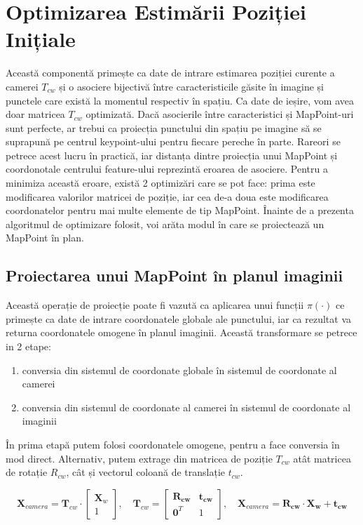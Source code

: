 \documentclass[12pt,a4paper]{report}
\begin{document}
\section{Optimizarea Estimării Poziției Inițiale}
Această componentă primește ca date de intrare estimarea poziției curente a camerei
\(T_{cw}\) și o asociere bijectivă între caracteristicile găsite în imagine și punctele 
care există la momentul respectiv în spațiu. Ca date de ieșire, vom avea doar matricea 
\(T_{cw}\) optimizată. Dacă asocierile între caracteristici și MapPoint-uri
sunt perfecte, ar trebui ca proiecția punctului din spațiu pe imagine să se suprapună pe 
centrul keypoint-ului pentru fiecare pereche în parte. Rareori se petrece acest lucru în practică, iar distanța dintre
proiecția unui MapPoint și coordonotale centrului feature-ului reprezintă eroarea de 
asociere. Pentru a minimiza această eroare, există 2 optimizări care se pot face:
prima este modificarea valorilor matricei de poziție, iar cea de-a doua este modificarea 
coordonatelor pentru mai multe elemente de tip MapPoint. Înainte de a prezenta algoritmul de optimizare
folosit, voi arăta modul în care se proiectează un MapPoint în plan.
\subsection{Proiectarea unui MapPoint în planul imaginii}
Această operație de proiecție poate fi vazută ca aplicarea unui funcții $ \pi(\cdot) $
ce primește ca date de intrare coordonatele globale ale punctului, iar ca rezultat va
returna coordonatele omogene în planul imaginii. Această transformare se petrece in 
2 etape:
\begin{enumerate}
    \item conversia din sistemul de coordonate globale în sistemul de coordonate al camerei
    \item conversia din sistemul de coordonate al camerei în sistemul de coordonate al imaginii
\end{enumerate}
În prima etapă putem folosi coordonatele omogene, pentru a face conversia în mod direct.
Alternativ, putem extrage din matricea de poziție \(T_{cw}\) atât matricea de 
rotație \(R_{cw}\), cât și vectorul coloană de translație \(t_{cw}\).

\begin{equation}
\mathbf{X}_{camera} = \mathbf{T}_{cw} \cdot 
\begin{bmatrix}
\mathbf{X}_w \\
1
\end{bmatrix}, \quad
\mathbf{T}_{cw} =
\begin{bmatrix}
\mathbf{R_{cw}} & \mathbf{t_{cw}} \\
\mathbf{0}^T & 1
\end{bmatrix}, \quad
\mathbf{X}_{camera} = \mathbf{R_{cw}} \cdot \mathbf{X_w} + \mathbf{t_{cw}}
\end{equation}
\end{document}
